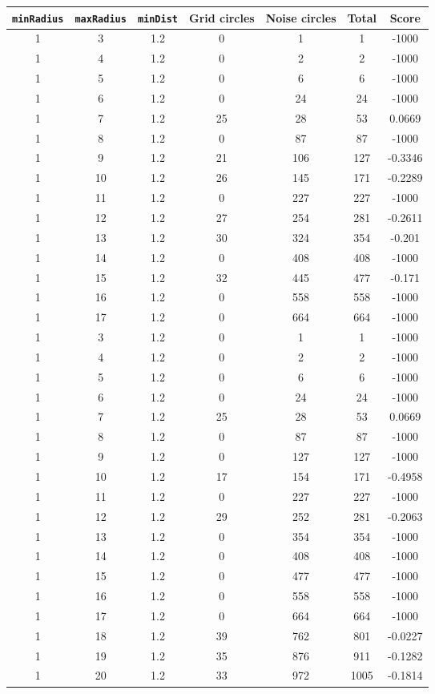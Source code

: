 \documentclass[letterpaper, 12pt]{article}
\begin{document}
\begin{longtable}{|c|c|c|c|c|c|c|}
\hline
\textbf{\texttt{minRadius}} & \textbf{\texttt{maxRadius}} & \textbf{\texttt{minDist}} & \textbf{Grid circles} & \textbf{Noise circles} & \textbf{Total} & \textbf{Score} \\
\hline
1 & 3 & 1.2 & 0 & 1 & 1 & -1000 \\
\hline
1 & 4 & 1.2 & 0 & 2 & 2 & -1000 \\
\hline
1 & 5 & 1.2 & 0 & 6 & 6 & -1000 \\
\hline
1 & 6 & 1.2 & 0 & 24 & 24 & -1000 \\
\hline
1 & 7 & 1.2 & 25 & 28 & 53 & 0.0669 \\
\hline
1 & 8 & 1.2 & 0 & 87 & 87 & -1000 \\
\hline
1 & 9 & 1.2 & 21 & 106 & 127 & -0.3346 \\
\hline
1 & 10 & 1.2 & 26 & 145 & 171 & -0.2289 \\
\hline
1 & 11 & 1.2 & 0 & 227 & 227 & -1000 \\
\hline
1 & 12 & 1.2 & 27 & 254 & 281 & -0.2611 \\
\hline
1 & 13 & 1.2 & 30 & 324 & 354 & -0.201 \\
\hline
1 & 14 & 1.2 & 0 & 408 & 408 & -1000 \\
\hline
1 & 15 & 1.2 & 32 & 445 & 477 & -0.171 \\
\hline
1 & 16 & 1.2 & 0 & 558 & 558 & -1000 \\
\hline
1 & 17 & 1.2 & 0 & 664 & 664 & -1000 \\
\hline
1 & 3 & 1.2 & 0 & 1 & 1 & -1000 \\
\hline
1 & 4 & 1.2 & 0 & 2 & 2 & -1000 \\
\hline
1 & 5 & 1.2 & 0 & 6 & 6 & -1000 \\
\hline
1 & 6 & 1.2 & 0 & 24 & 24 & -1000 \\
\hline
1 & 7 & 1.2 & 25 & 28 & 53 & 0.0669 \\
\hline
1 & 8 & 1.2 & 0 & 87 & 87 & -1000 \\
\hline
1 & 9 & 1.2 & 0 & 127 & 127 & -1000 \\
\hline
1 & 10 & 1.2 & 17 & 154 & 171 & -0.4958 \\
\hline
1 & 11 & 1.2 & 0 & 227 & 227 & -1000 \\
\hline
1 & 12 & 1.2 & 29 & 252 & 281 & -0.2063 \\
\hline
1 & 13 & 1.2 & 0 & 354 & 354 & -1000 \\
\hline
1 & 14 & 1.2 & 0 & 408 & 408 & -1000 \\
\hline
1 & 15 & 1.2 & 0 & 477 & 477 & -1000 \\
\hline
1 & 16 & 1.2 & 0 & 558 & 558 & -1000 \\
\hline
1 & 17 & 1.2 & 0 & 664 & 664 & -1000 \\
\hline
1 & 18 & 1.2 & 39 & 762 & 801 & -0.0227 \\
\hline
1 & 19 & 1.2 & 35 & 876 & 911 & -0.1282 \\
\hline
1 & 20 & 1.2 & 33 & 972 & 1005 & -0.1814 \\
\hline
\end{longtable}
\end{document}
